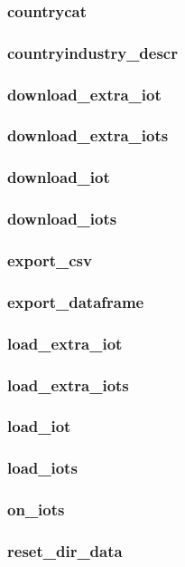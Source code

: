 \documentclass[10pt,a4paper]{paper}
\begin{document}
	\subsubsection{countrycat}
	
	\subsubsection{countryindustry\_descr}
	
	\subsubsection{download\_extra\_iot}
	
	\subsubsection{download\_extra\_iots}
	
	\subsubsection{download\_iot}
	
	\subsubsection{download\_iots}
	
	\subsubsection{export\_csv}
	
	\subsubsection{export\_dataframe}
	
	\subsubsection{load\_extra\_iot}
	
	\subsubsection{load\_extra\_iots}
	
	\subsubsection{load\_iot}
	
	\subsubsection{load\_iots}
	
	\subsubsection{on\_iots}
	
	\subsubsection{reset\_dir\_data}	
	
	
\end{document}
